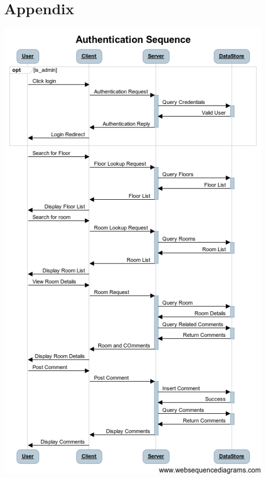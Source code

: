 \documentclass{sig-alt-release2}
\begin{document}



\section{Appendix}
\begin{center}
\includegraphics[scale=0.35]{img/dia.png}
\end{center}

%
\end{document}
